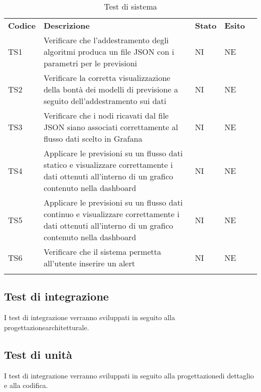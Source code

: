 \begin{longtable} {
		>{}p{15mm} 
		>{}p{79.5mm}
		>{}p{15mm} 
		>{}p{15mm}
		>{}p{0mm}}
	\rowcolor{gray!50}
	\textbf{Codice} & \textbf{Descrizione} & \textbf{Stato} & \textbf{Esito} &\TBstrut \\
	TS1 & Verificare che l'addestramento degli algoritmi produca un file JSON con i parametri per le previsioni & NI & NE  &\TBstrut \\ [2mm]
	TS2 & Verificare la corretta visualizzazione della bontà dei modelli di previsione a seguito dell'addestramento sui dati & NI & NE  &\TBstrut \\ [2mm]
	TS3 & Verificare che i nodi ricavati dal file JSON siano associati correttamente al flusso dati scelto in Grafana\glo & NI & NE  &\TBstrut \\ [2mm]
	TS4 & Applicare le previsioni su un flusso dati statico e visualizzare correttamente i dati ottenuti all'interno di un grafico contenuto nella dashboard\glo & NI & NE  &\TBstrut \\ [2mm]
	TS5 & Applicare le previsioni su un flusso dati continuo e visualizzare correttamente i dati ottenuti all'interno di un grafico contenuto nella dashboard\glo & NI & NE  &\TBstrut \\ [2mm]
	TS6 & Verificare che il sistema permetta all'utente inserire un alert\glo & NI & NE  &\TBstrut \\ [2mm]
	\rowcolor{white}
	\caption{Test di sistema}
\end{longtable}


\subsection{Test di integrazione}
I test di integrazione verranno sviluppati in seguito alla progettazione\glosp architetturale.

\subsection{Test di unità}
I test di integrazione verranno sviluppati in seguito alla progettazione\glosp di dettaglio e alla codifica.
